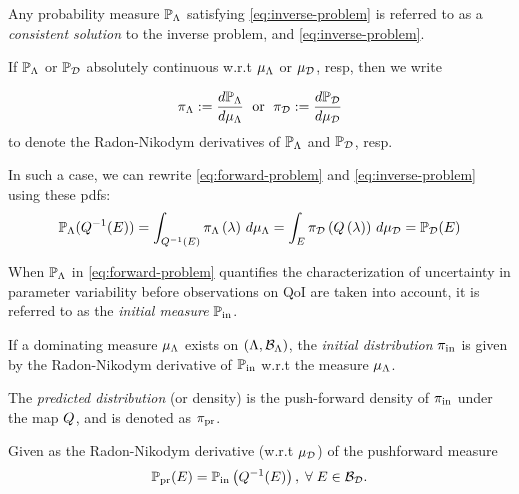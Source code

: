 \begin{frame}[t]

\begin{defn}\label{defn:consistent-solution}
  \noindent Any probability measure $\mathbb{P}_{\Lambda}$ satisfying \eqref{eq:inverse-problem} is referred to as a \emph{consistent solution} to the inverse problem, and \eqref{eq:inverse-problem}.

  If $\mathbb{P}_{\Lambda}$ or $\mathbb{P}_{\mathcal{D}}$ absolutely continuous w.r.t $\mu_{{\Lambda}}$ or $\mu_{\mathcal{D}}$, resp, then we write

  \begin{equation*}
    \pi_{\Lambda} := \frac{d\mathbb{P}_{\Lambda}}{d\mu_{{\Lambda}}} \;\text{ or }\; \pi_{\mathcal{D}} := \frac{d\mathbb{P}_{\mathcal{D}}}{d\mu_{\mathcal{D}}}
  \end{equation*}
  to denote the Radon-Nikodym derivatives of $\mathbb{P}_{\Lambda}$ and $\mathbb{P}_{\mathcal{D}}$, resp.

  In such a case, we can rewrite \eqref{eq:forward-problem} and \eqref{eq:inverse-problem} using these pdfs:
  \begin{equation*}
  \mathbb{P}_{\Lambda} (Q^{-1}(E)) = \int_{Q^{-1}(E)} \pi_{\Lambda} \left ( \lambda \right ) \, d\mu_{{\Lambda}} = \int_E \pi_{\mathcal{D}} \left ( Q\left ( \lambda \right ) \right ) \, d\mu_{\mathcal{D}} = \mathbb{P}_{\mathcal{D}}(E)
  \end{equation*}

\end{defn}

\end{frame}


\begin{frame}[t]

\begin{defn}\label{defn:initial}
  When $\mathbb{P}_{\Lambda}$ in \eqref{eq:forward-problem} quantifies the characterization of uncertainty in parameter variability before observations on QoI are taken into account, it is referred to as the \emph{initial measure} $\operatorname*{\mathbb{P}_{in}}$.

  If a dominating measure $\mu_{\Lambda}$ exists on $({\Lambda}, \mathcal{B}_{{\Lambda}})$, the \emph{initial distribution} $\operatorname*{\pi_{in}}$ is given by the Radon-Nikodym derivative of $\operatorname*{\mathbb{P}_{in}}$ w.r.t the measure $\mu_{{\Lambda}}$.
\end{defn}

\begin{defn}\label{defn:predicted}
 The \emph{predicted distribution} (or density) is the push-forward density of $\operatorname*{\pi_{in}}$ under the map $Q$, and is denoted as $\operatorname*{\pi_{pr}}$.

  Given as the Radon-Nikodym derivative (w.r.t $\mu_{\mathcal{D}}$) of the pushforward measure
 \begin{equation}\label{eq:predicted}
    \operatorname*{\mathbb{P}_{pr}} (E) = \operatorname*{\mathbb{P}_{in}} \left ( Q^{-1}(E) \right ), \; \forall \; E \in \mathcal{B}_{\mathcal{D}}.
  \end{equation}
\end{defn}


\end{frame}



